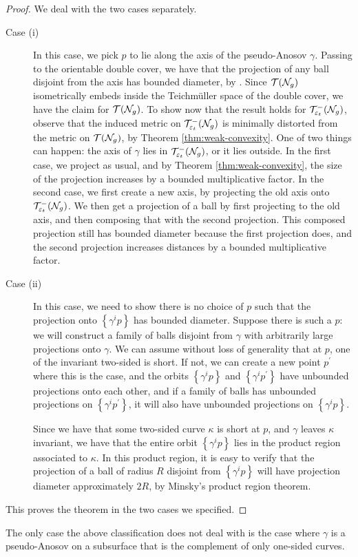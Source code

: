 \begin{proof}
  We deal with the two cases separately.
  \begin{description}
  \item[Case (i)] In this case, we pick $p$ to lie along the axis of the pseudo-Anosov $\gamma$.
    Passing to the orientable double cover, we have that the projection of any ball disjoint from the axis has bounded diameter, by \textcite{minsky1996quasi}.
    Since $\mathcal{T}(\mathcal{N}_g)$ isometrically embeds inside the Teichmüller space of the double cover, we have the claim for $\mathcal{T}(\mathcal{N}_g)$.
    To show now that the result holds for $\mathcal{T}_{\varepsilon_t}^{-}(\mathcal{N}_g)$, observe that the induced metric on $\mathcal{T}_{\varepsilon_t}^{-}(\mathcal{N}_g)$ is minimally distorted from the metric on $\mathcal{T}(\mathcal{N}_g)$, by Theorem \ref{thm:weak-convexity}.
    One of two things can happen: the axis of $\gamma$ lies in $\mathcal{T}_{\varepsilon_t}^{-}(\mathcal{N}_g)$, or it lies outside.
    In the first case, we project as usual, and by Theorem \ref{thm:weak-convexity}, the size of the projection increases by a bounded multiplicative factor.
    In the second case, we first create a new axis, by projecting the old axis onto $\mathcal{T}_{\varepsilon_t}^{-}(\mathcal{N}_g)$.
    We then get a projection of a ball by first projecting to the old axis, and then composing that with the second projection.
    This composed projection still has bounded diameter because the first projection does, and the second projection increases distances by a bounded multiplicative factor.
  \item[Case (ii)] In this case, we need to show there is no choice of $p$ such that the projection onto $\left\{ \gamma^i p \right\}$ has bounded diameter.
    Suppose there is such a $p$: we will construct a family of balls disjoint from $\gamma$ with arbitrarily large projections onto $\gamma$.
    We can assume without loss of generality that at $p$, one of the invariant two-sided is short.
    If not, we can create a new point $p^{\prime}$ where this is the case, and the orbits $\left\{ \gamma^i p \right\}$ and $\left\{ \gamma^i p^{\prime} \right\}$ have unbounded projections onto each other, and if a family of balls has unbounded projections on $\left\{ \gamma^i p^{\prime} \right\}$, it will also have unbounded projections on $\left\{ \gamma^i p \right\}$.

    Since we have that some two-sided curve $\kappa$ is short at $p$, and $\gamma$ leaves $\kappa$ invariant, we have that the entire orbit $\left\{ \gamma^i p \right\}$ lies in the product region associated to $\kappa$.
    In this product region, it is easy to verify that the projection of a ball of radius $R$ disjoint from $\left\{ \gamma^i p \right\}$ will have projection diameter approximately $2R$, by Minsky's product region theorem.
  \end{description}
  This proves the theorem in the two cases we specified.
\end{proof}

\begin{remark}
  The only case the above classification does not deal with is the case where $\gamma$ is a pseudo-Anosov on a subsurface that is the complement of only one-sided curves.
\end{remark}

